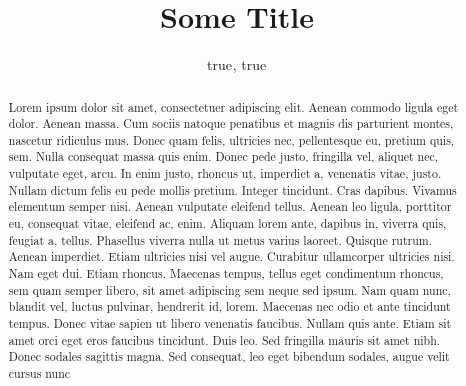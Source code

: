 \documentclass[]{cik}%
\begin{document}
\captionsetup[table]{labelformat=empty}
\captionsetup[figure]{labelformat=empty}
\raggedbottom

\title{Some Title}

\author{
true$^{}$,
true$^{}$}

\address{
  $^{1}$Carnegie Mellon University\\
  $^{2}$University of Chicago\\
  $^{3}$University of California - San Diego}
\subject{
Another Science
}






\begin{abstract}
Lorem ipsum dolor sit amet, consectetuer adipiscing elit. Aenean commodo
ligula eget dolor. Aenean massa. Cum sociis natoque penatibus et magnis
dis parturient montes, nascetur ridiculus mus. Donec quam felis,
ultricies nec, pellentesque eu, pretium quis, sem. Nulla consequat massa
quis enim. Donec pede justo, fringilla vel, aliquet nec, vulputate eget,
arcu. In enim justo, rhoncus ut, imperdiet a, venenatis vitae, justo.
Nullam dictum felis eu pede mollis pretium. Integer tincidunt. Cras
dapibus. Vivamus elementum semper nisi. Aenean vulputate eleifend
tellus. Aenean leo ligula, porttitor eu, consequat vitae, eleifend ac,
enim. Aliquam lorem ante, dapibus in, viverra quis, feugiat a, tellus.
Phasellus viverra nulla ut metus varius laoreet. Quisque rutrum. Aenean
imperdiet. Etiam ultricies nisi vel augue. Curabitur ullamcorper
ultricies nisi. Nam eget dui. Etiam rhoncus. Maecenas tempus, tellus
eget condimentum rhoncus, sem quam semper libero, sit amet adipiscing
sem neque sed ipsum. Nam quam nunc, blandit vel, luctus pulvinar,
hendrerit id, lorem. Maecenas nec odio et ante tincidunt tempus. Donec
vitae sapien ut libero venenatis faucibus. Nullam quis ante. Etiam sit
amet orci eget eros faucibus tincidunt. Duis leo. Sed fringilla mauris
sit amet nibh. Donec sodales sagittis magna. Sed consequat, leo eget
bibendum sodales, augue velit cursus nunc
\end{abstract}
\end{document}
